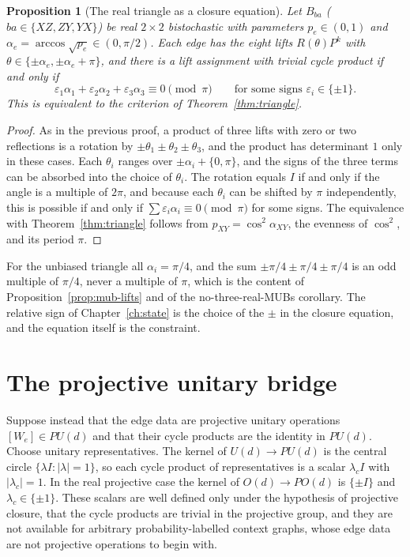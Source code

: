 \documentclass[11pt,oneside]{book}
\newtheorem{proposition}[theorem]{Proposition}
\theoremstyle{definition}
\theoremstyle{remark}
\begin{document}
\begin{proposition}[The real triangle as a closure equation]\label{prop:triangle-closure}
Let $B_{ba}$ ($ba\in\{XZ,ZY,YX\}$) be real $2\times2$ bistochastic with parameters $p_e\in(0,1)$ and $\alpha_e=\arccos\sqrt{p_e}\in(0,\pi/2)$. Each edge has the eight lifts $R(\theta)P^{k}$ with $\theta\in\{\pm\alpha_e,\pm\alpha_e+\pi\}$, and there is a lift assignment with trivial cycle product if and only if
\[
\varepsilon_1\alpha_1+\varepsilon_2\alpha_2+\varepsilon_3\alpha_3\equiv0\pmod\pi\qquad\text{for some signs }\varepsilon_i\in\{\pm1\}.
\]
This is equivalent to the criterion of Theorem~\ref{thm:triangle}.
\end{proposition}

\begin{proof}
As in the previous proof, a product of three lifts with zero or two reflections is a rotation by $\pm\theta_1\pm\theta_2\pm\theta_3$, and the product has determinant $1$ only in these cases. Each $\theta_i$ ranges over $\pm\alpha_i+\{0,\pi\}$, and the signs of the three terms can be absorbed into the choice of $\theta_i$. The rotation equals $I$ if and only if the angle is a multiple of $2\pi$, and because each $\theta_i$ can be shifted by $\pi$ independently, this is possible if and only if $\sum\varepsilon_i\alpha_i\equiv0\pmod\pi$ for some signs. The equivalence with Theorem~\ref{thm:triangle} follows from $p_{XY}=\cos^2\alpha_{XY}$, the evenness of $\cos^2$, and its period $\pi$.
\end{proof}

For the unbiased triangle all $\alpha_i=\pi/4$, and the sum $\pm\pi/4\pm\pi/4\pm\pi/4$ is an odd multiple of $\pi/4$, never a multiple of $\pi$, which is the content of Proposition~\ref{prop:mub-lifts} and of the no-three-real-MUBs corollary. The relative sign of Chapter~\ref{ch:state} is the choice of the $\pm$ in the closure equation, and the equation itself is the constraint.

\section*{The projective unitary bridge}

Suppose instead that the edge data are projective unitary operations $[W_e]\in PU(d)$ and that their cycle products are the identity in $PU(d)$. Choose unitary representatives. The kernel of $U(d)\to PU(d)$ is the central circle $\{\lambda I:|\lambda|=1\}$, so each cycle product of representatives is a scalar $\lambda_cI$ with $|\lambda_c|=1$. In the real projective case the kernel of $O(d)\to PO(d)$ is $\{\pm I\}$ and $\lambda_c\in\{\pm1\}$. These scalars are well defined only under the hypothesis of projective closure, that the cycle products are trivial in the projective group, and they are not available for arbitrary probability-labelled context graphs, whose edge data are not projective operations to begin with.
\end{document}
